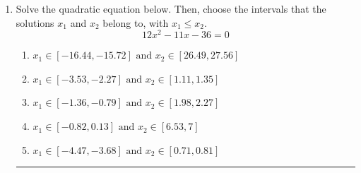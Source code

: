 \documentclass[14pt]{extbook}
\newcommand{\litem}[1]{\item#1\hspace*{-1cm}\rule{\textwidth}{0.4pt}}
\begin{document}
\begin{enumerate}
{\begin{enumerate}[label=\Alph*.]
\end{enumerate} }
\litem{
Solve the quadratic equation below. Then, choose the intervals that the solutions $x_1$ and $x_2$ belong to, with $x_1 \leq x_2$.\[ 12x^{2} -11 x -36 = 0 \]\begin{enumerate}[label=\Alph*.]
\item \( x_1 \in [-16.44, -15.72] \text{ and } x_2 \in [26.49, 27.56] \)
\item \( x_1 \in [-3.53, -2.27] \text{ and } x_2 \in [1.11, 1.35] \)
\item \( x_1 \in [-1.36, -0.79] \text{ and } x_2 \in [1.98, 2.27] \)
\item \( x_1 \in [-0.82, 0.13] \text{ and } x_2 \in [6.53, 7] \)
\item \( x_1 \in [-4.47, -3.68] \text{ and } x_2 \in [0.71, 0.81] \)


\end{enumerate}}
\end{enumerate}
\end{document}
